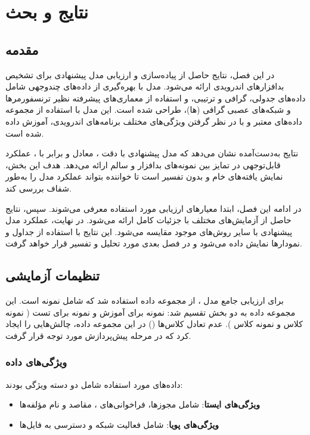 \clearpage
\thispagestyle{empty}

\chapter{نتایج و بحث}\label{chap5}

\section{مقدمه}
در این فصل، نتایج حاصل از پیاده‌سازی و ارزیابی مدل پیشنهادی  برای تشخیص بدافزارهای اندرویدی ارائه می‌شود. مدل  با بهره‌گیری از داده‌های چندوجهی شامل داده‌های جدولی، گرافی و ترتیبی، و استفاده از معماری‌های پیشرفته نظیر ترنسفورمرها و شبکه‌های عصبی گرافی (ها)، طراحی شده است. این مدل با استفاده از مجموعه داده‌های معتبر و با در نظر گرفتن ویژگی‌های مختلف برنامه‌های اندرویدی، آموزش داده شده است.

نتایج به‌دست‌آمده نشان می‌دهد که مدل پیشنهادی با دقت ،  معادل  و  برابر با ، عملکرد قابل‌توجهی در تمایز بین نمونه‌های بدافزار و سالم ارائه می‌دهد. هدف این بخش، نمایش یافته‌های خام و بدون تفسیر است تا خواننده بتواند عملکرد مدل را به‌طور شفاف بررسی کند.

در ادامه این فصل، ابتدا معیارهای ارزیابی مورد استفاده معرفی می‌شوند. سپس، نتایج حاصل از آزمایش‌های مختلف با جزئیات کامل ارائه می‌شود. در نهایت، عملکرد مدل پیشنهادی با سایر روش‌های موجود مقایسه می‌شود. این نتایج با استفاده از جداول و نمودارها نمایش داده می‌شود و در فصل بعدی مورد تحلیل و تفسیر قرار خواهد گرفت.

\section{تنظیمات آزمایشی}
برای ارزیابی جامع مدل ، از مجموعه داده  \cite{Drebin} استفاده شد که شامل  نمونه است. این مجموعه داده به دو بخش تقسیم شد:  نمونه برای آموزش و  نمونه برای تست ( نمونه کلاس  و  نمونه کلاس ). عدم تعادل کلاس‌ها () در این مجموعه داده، چالش‌هایی را ایجاد کرد که در مرحله پیش‌پردازش مورد توجه قرار گرفت.

\subsection{ویژگی‌های داده}
داده‌های مورد استفاده شامل دو دسته ویژگی بودند:
\begin{itemize}
    \renewcommand{\labelitemi}{\lr{$\bullet$}}
    \item \textbf{ویژگی‌های ایستا}: شامل مجوزها، فراخوانی‌های ، مقاصد و نام مؤلفه‌ها
    \item \textbf{ویژگی‌های پویا}: شامل فعالیت شبکه و دسترسی به فایل‌ها
\end{itemize}

